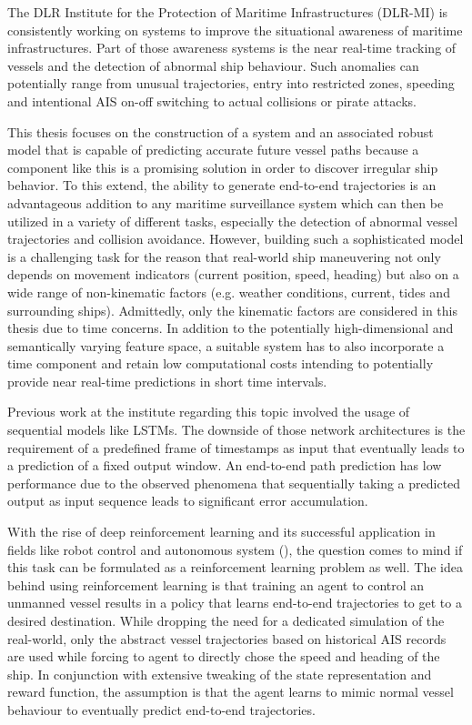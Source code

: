 The DLR Institute for the Protection of Maritime Infrastructures (DLR-MI) is consistently working on systems to improve the situational awareness of maritime infrastructures. Part of those awareness systems is the near real-time tracking of vessels and the detection of abnormal ship behaviour. Such anomalies can potentially range from unusual trajectories, entry into restricted zones, speeding and intentional AIS on-off switching to actual collisions or pirate attacks.
\par
This thesis focuses on the construction of a system and an associated robust model that is capable of predicting accurate future vessel paths because a component like this is a promising solution in order to discover irregular ship behavior. To this extend, the ability to generate end-to-end trajectories is an advantageous addition to any maritime surveillance system which can then be utilized in a variety of different tasks, especially the detection of abnormal vessel trajectories and collision avoidance.
However, building such a sophisticated model is a challenging task for the reason that real-world ship maneuvering not only depends on movement indicators (current position, speed, heading) but also on a wide range of non-kinematic factors (e.g. weather conditions, current, tides and surrounding ships). Admittedly, only the kinematic factors are considered in this thesis due to time concerns. In addition to the potentially high-dimensional and semantically varying feature space, a suitable system has to also incorporate a time component and retain low computational costs intending to potentially provide near real-time predictions in short time intervals.
\par
Previous work at the institute regarding this topic involved the usage of sequential models like LSTMs. The downside of those network architectures is the requirement of a predefined frame of timestamps as input that eventually leads to a prediction of a fixed output window. An end-to-end path prediction has low performance due to the observed phenomena that sequentially taking a predicted output as input sequence leads to significant error accumulation.
\par
With the rise of deep reinforcement learning and its successful application in fields like robot control and autonomous system (\cite{s18092905, zare2021continuous, 9195789, martinsen2018curved}), the question comes to mind if this task can be formulated as a reinforcement learning problem as well. The idea behind using reinforcement learning is that training an agent to control an unmanned vessel results in a policy that learns end-to-end trajectories to get to a desired destination. While dropping the need for a dedicated simulation of the real-world, only the abstract vessel trajectories based on historical AIS records are used while forcing to agent to directly chose the speed and heading of the ship. In conjunction with extensive tweaking of the state representation and reward function, the assumption is that the agent learns to mimic normal vessel behaviour to eventually predict end-to-end trajectories.
